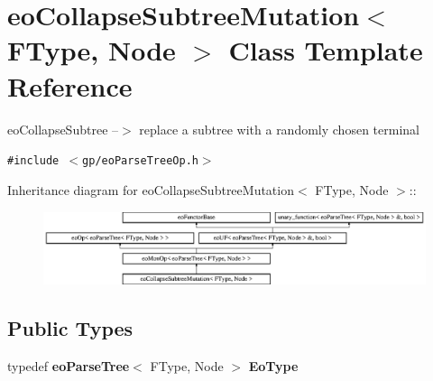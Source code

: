 \section{eo\-Collapse\-Subtree\-Mutation$<$ FType, Node $>$ Class Template Reference}
\label{classeo_collapse_subtree_mutation}
eo\-Collapse\-Subtree --$>$ replace a subtree with a randomly chosen terminal  


{\tt \#include $<$gp/eo\-Parse\-Tree\-Op.h$>$}

Inheritance diagram for eo\-Collapse\-Subtree\-Mutation$<$ FType, Node $>$::\begin{figure}[H]
\begin{center}
\leavevmode
\includegraphics[height=2.14559cm]{classeo_collapse_subtree_mutation}
\end{center}
\end{figure}
\subsection*{Public Types}
\begin{CompactItemize}
\item 
typedef {\bf eo\-Parse\-Tree}$<$ FType, Node $>$ {\bf Eo\-Type}\label{classeo_collapse_subtree_mutation_w0}

\end{CompactItemize}
